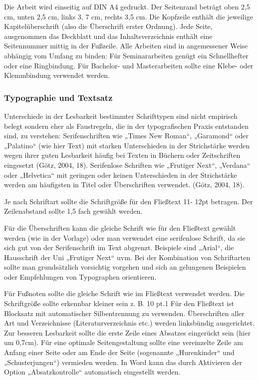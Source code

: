 Die Arbeit wird einseitig auf DIN A4 gedruckt. Der Seitenrand beträgt oben 2,5 cm, unten 2,5 cm, links 3, 7 cm, rechts 3,5 cm. Die Kopfzeile enthält die jeweilige Kapitelüberschrift (also die Überschrift erster Ordnung). Jede Seite, ausgenommen das Deckblatt und das Inhaltsverzeichnis enthält eine Seitennummer mittig in der Fußzeile. Alle Arbeiten sind in angemessener Weise abhängig vom Umfang zu binden: Für Seminararbeiten genügt ein Schnellhefter oder eine Ringbindung. Für Bachelor- und Masterarbeiten sollte eine Klebe- oder Klemmbindung verwendet werden.

\subsubsection{Typographie und Textsatz}\label{subsubsec:typographie}

Unterschiede in der Lesbarkeit bestimmter Schrifttypen sind nicht empirisch belegt sondern eher als Faustregeln, die in der typografischen Praxis entstanden sind, zu verstehen:  Serifenschriften wie „Times New Roman“, „Garamond“ oder „Palatino“ (wie hier Text)  mit starken Unterschieden in der Strichstärke werden wegen ihrer guten Lesbarkeit häufig bei Texten in Büchern oder Zeitschriften eingesetzt (Götz, 2004, 18). Serifenlose Schriften wie „Frutiger Next“, „Verdana“ oder „Helvetica“ mit geringen oder keinen Unterschieden in der Strichstärke werden am häufigsten in Titel oder Überschriften verwendet. (Götz, 2004, 18). 

  Je nach Schriftart sollte die Schriftgröße für den Fließtext 11- 12pt betragen. Der Zeilenabstand sollte 1,5 fach gewählt werden.

Für die Überschriften kann die gleiche Schrift wie für den Fließtext gewählt werden (wie in der Vorlage) oder man verwendet eine serifenlose Schrift, da sie sich gut von der Serifenschrift im Text abgrenzt. Beispiele sind „Arial“, die Hausschrift der Uni „Frutiger Next“ uvm. Bei der Kombination von Schriftarten sollte man grundsätzlich vorsichtig vorgehen und sich an gelungenen Beispielen oder Empfehlungen von Typographen orientieren. 

Für Fußnoten sollte die gleiche Schrift wie im Fließtext verwendet werden. Die Schriftgröße sollte erkennbar kleiner sein z. B. 10 pt.1 Für den Fließtext ist Blocksatz mit automatischer Silbentrennung zu verwenden. Überschriften aller Art und Verzeichnisse (Literaturverzeichnis etc.) werden linksbündig ausgerichtet. Zur besseren Lesbarkeit sollte die erste Zeile eines Absatzes eingerückt sein (hier um 0,7cm). Für eine optimale Seitengestaltung sollte eine vereinzelte Zeile am Anfang einer Seite oder am Ende der Seite (sogenannte „Hurenkinder“ und „Schusterjungen“) vermieden werden. In Word kann das durch Aktivieren der Option „Absatzkontrolle“ automatisch eingestellt werden.

